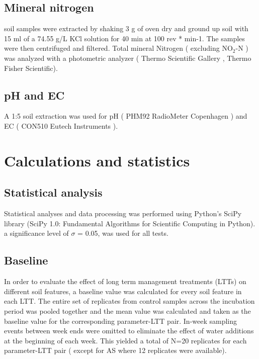     \subsection{Mineral nitrogen}

    	soil samples were extracted by shaking 3 g of oven dry and ground up soil with 15 ml of a 74.55 g/L KCl solution for 40 min at 100 rev * min-1. The samples were then centrifuged and filtered. Total mineral Nitrogen ( excluding NO$_2$-N ) was analyzed with a photometric analyzer ( Thermo Scientific Gallery , Thermo Fisher Scientific).

    \subsection{pH and EC}

    	A 1:5 soil extraction was used for pH ( PHM92 RadioMeter Copenhagen ) and EC ( CON510 Eutech Instruments ).


\section{Calculations and statistics}

    \subsection{Statistical analysis}

  	 Statistical analyses and data processing was performed using Python’s SciPy library (SciPy 1.0: Fundamental Algorithms for Scientific Computing in Python).  a significance level of $\sigma$  = 0.05, was used for all tests. \\

    \subsection{Baseline}

    	In order to evaluate the effect of long term management treatments (LTTs) on different soil features, a baseline value was calculated for every soil feature in each LTT. The entire set of replicates from control samples across the incubation period was pooled together and the mean value was calculated and taken as the baseline value for the corresponding parameter-LTT pair. In-week sampling events between week ends were omitted to eliminate the effect of water additions at the beginning of each week. This yielded a total of N=20 replicates for each parameter-LTT pair ( except for AS where 12 replicates were available).

